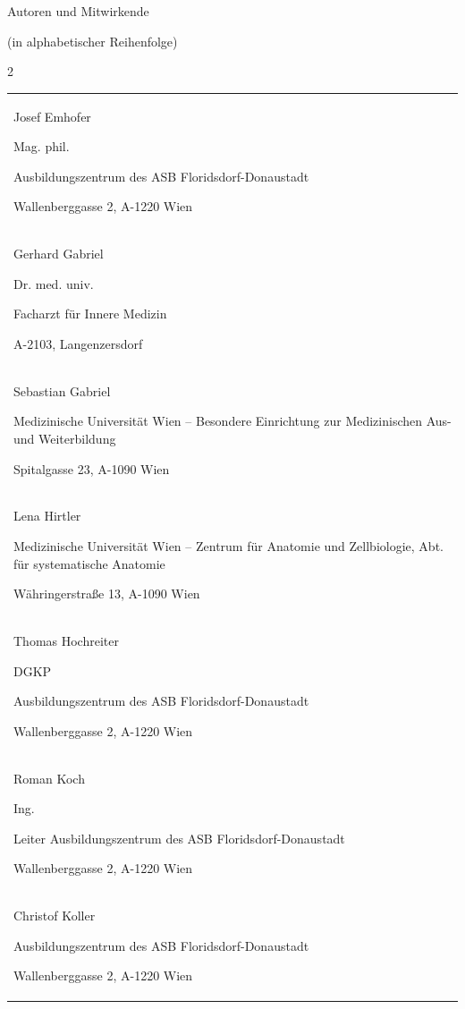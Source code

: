 \documentclass{article}
\begin{document}
\setcounter{tocdepth}{1}
\renewcommand\contentsname{Inhalt - Schnell\"ubersicht}
\tableofcontents
\setcounter{tocdepth}{10}
\renewcommand\contentsname{Inhalt - Detail\"ubersicht}
\tableofcontents
Autoren und Mitwirkende

(in alphabetischer Reihenfolge)

\begin{multicols}{2}
\begin{center}
\begin{tabular}{m{6.813cm}}
Josef Emhofer

Mag. phil.

Ausbildungszentrum des ASB Floridsdorf-Donaustadt

Wallenberggasse 2, A-1220 Wien

\\
Gerhard Gabriel

Dr. med. univ. 

Facharzt f\"ur Innere Medizin

A-2103, Langenzersdorf

\\
Sebastian Gabriel

Medizinische Universit\"at Wien -- Besondere Einrichtung zur
Medizinischen Aus- und Weiterbildung

Spitalgasse 23, A-1090 Wien

\\
Lena Hirtler

Medizinische Universit\"at Wien -- Zentrum f\"ur Anatomie und
Zellbiologie, Abt. f\"ur systematische Anatomie

W\"ahringerstra{\ss}e 13, A-1090 Wien 

\\
Thomas Hochreiter

DGKP

Ausbildungszentrum des ASB Floridsdorf-Donaustadt

Wallenberggasse 2, A-1220 Wien

\\
Roman Koch

Ing.

Leiter Ausbildungszentrum des ASB Floridsdorf-Donaustadt

Wallenberggasse 2, A-1220 Wien

\\
Christof Koller

Ausbildungszentrum des ASB Floridsdorf-Donaustadt

Wallenberggasse 2, A-1220 Wien


\end{tabular}
\end{center}
\end{multicols}
\end{document}
